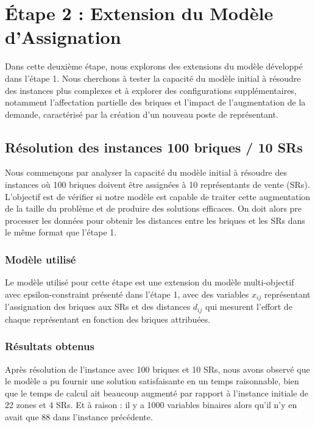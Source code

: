 \section{Étape 2 : Extension du Modèle d'Assignation}

Dans cette deuxième étape, nous explorons des extensions du modèle développé dans l'étape 1. Nous cherchons à tester la capacité du modèle initial à résoudre des instances plus complexes et à explorer des configurations supplémentaires, notamment l'affectation partielle des briques et l'impact de l'augmentation de la demande, caractérisé par la création d'un nouveau poste de représentant.

\subsection{Résolution des instances 100 briques / 10 SRs}
Nous commençons par analyser la capacité du modèle initial à résoudre des instances où 100 briques doivent être assignées à 10 représentants de vente (SRs). L'objectif est de vérifier si notre modèle est capable de traiter cette augmentation de la taille du problème et de produire des solutions efficaces. On doit alors pre processer les données pour obtenir les distances entre les briques et les SRs dans le même format que l'étape 1.

\subsubsection{Modèle utilisé}
Le modèle utilisé pour cette étape est une extension du modèle multi-objectif avec epsilon-constraint présenté dans l’étape 1, avec des variables $x_{ij}$ représentant l'assignation des briques aux SRs et des distances $d_{ij}$ qui mesurent l'effort de chaque représentant en fonction des briques attribuées.

\subsubsection{Résultats obtenus}
Après résolution de l'instance avec 100 briques et 10 SRs, nous avons observé que le modèle a pu fournir une solution satisfaisante en un temps raisonnable, bien que le temps de calcul ait beaucoup augmenté par rapport à l'instance initiale de 22 zones et 4 SRs.
Et à raison : il y a 1000 variables binaires alors qu'il n'y en avait que 88 dans l'instance précédente.

